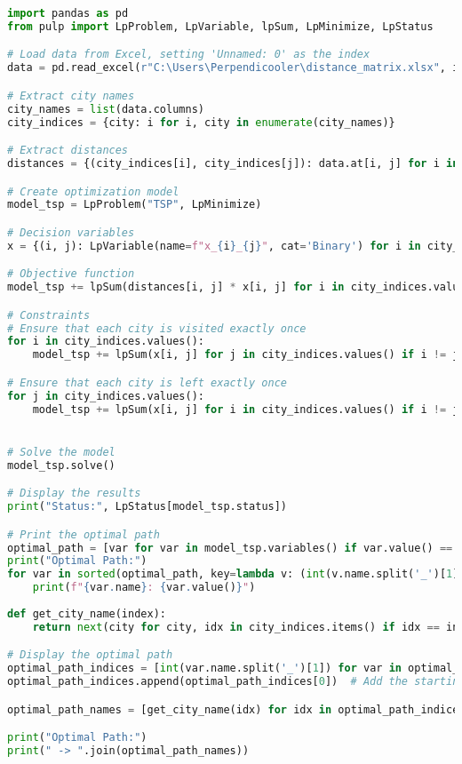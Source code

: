 \begin{center}
\begin{lstlisting}[language=Python, caption={Integer LP Formulation Implementation}]
import pandas as pd
from pulp import LpProblem, LpVariable, lpSum, LpMinimize, LpStatus

# Load data from Excel, setting 'Unnamed: 0' as the index
data = pd.read_excel(r"C:\Users\Perpendicooler\distance_matrix.xlsx", index_col='Unnamed: 0')

# Extract city names
city_names = list(data.columns)
city_indices = {city: i for i, city in enumerate(city_names)}

# Extract distances
distances = {(city_indices[i], city_indices[j]): data.at[i, j] for i in city_names for j in city_names if i != j}

# Create optimization model
model_tsp = LpProblem("TSP", LpMinimize)

# Decision variables
x = {(i, j): LpVariable(name=f"x_{i}_{j}", cat='Binary') for i in city_indices.values() for j in city_indices.values() if i != j}

# Objective function
model_tsp += lpSum(distances[i, j] * x[i, j] for i in city_indices.values() for j in city_indices.values() if i != j), "Minimize Distance"

# Constraints
# Ensure that each city is visited exactly once
for i in city_indices.values():
    model_tsp += lpSum(x[i, j] for j in city_indices.values() if i != j) == 1, f"VisitOnce_{i}"

# Ensure that each city is left exactly once
for j in city_indices.values():
    model_tsp += lpSum(x[i, j] for i in city_indices.values() if i != j) == 1, f"LeaveOnce_{j}"


# Solve the model
model_tsp.solve()

# Display the results
print("Status:", LpStatus[model_tsp.status])

# Print the optimal path
optimal_path = [var for var in model_tsp.variables() if var.value() == 1]
print("Optimal Path:")
for var in sorted(optimal_path, key=lambda v: (int(v.name.split('_')[1]), int(v.name.split('_')[2]))):
    print(f"{var.name}: {var.value()}")
    
def get_city_name(index):
    return next(city for city, idx in city_indices.items() if idx == index)

# Display the optimal path
optimal_path_indices = [int(var.name.split('_')[1]) for var in optimal_path]
optimal_path_indices.append(optimal_path_indices[0])  # Add the starting city at the end to complete the loop

optimal_path_names = [get_city_name(idx) for idx in optimal_path_indices]

print("Optimal Path:")
print(" -> ".join(optimal_path_names))    


\end{lstlisting}
    
\end{center}

